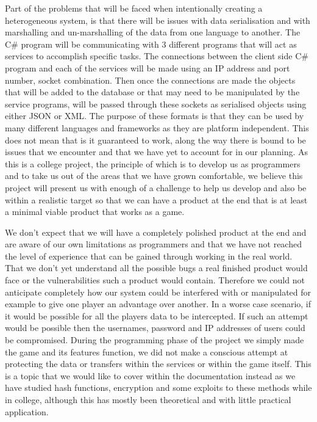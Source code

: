 Part of the problems that will be faced when intentionally creating a heterogeneous system, is that there will be issues with data serialisation and with marshalling and un-marshalling of the data from one language to another. The C# program will be communicating with 3 different programs that will act as services to accomplish specific tasks. The connections between the client side C# program and each of the services will be made using an IP address and port number, socket combination. Then once the connections are made the objects that will be added to the database or that may need to be manipulated by the service programs, will be passed through these sockets as serialised objects using either JSON or XML. The purpose of these formats is that they can be used by many different languages and frameworks as they are platform independent. This does not mean that is it guaranteed to work, along the way there is bound to be issues that we encounter and that we have yet to account for in our planning. As this is a college project, the principle of which is to develop us as programmers and to take us out of the areas that we have grown comfortable, we believe this project will present us with enough of a challenge to help us develop and also be within a realistic target so that we can have a product at the end that is at least a minimal viable product that works as a game. \newline

We don't expect that we will have a completely polished product at the end and are aware of our own limitations as programmers and that we have not reached the level of experience that can be gained through working in the real world. That we don't yet understand all the possible bugs a real finished product would face or the vulnerabilities such a product would contain. Therefore we could not anticipate completely how our system could be interfered with or manipulated for example to give one player an advantage over another. In a worse case scenario, if it would be possible for all the players data to be intercepted. If such an attempt would be possible then the usernames, password and IP addresses of users could be compromised. During the programming phase of the project we simply made the game and its features function, we did not make a conscious attempt at protecting the data or transfers within the services or within the game itself. This is a topic that we would like to cover within the documentation instead as we have studied hash functions, encryption and some exploits to these methods while in college, although this has mostly been theoretical and with little practical application.



